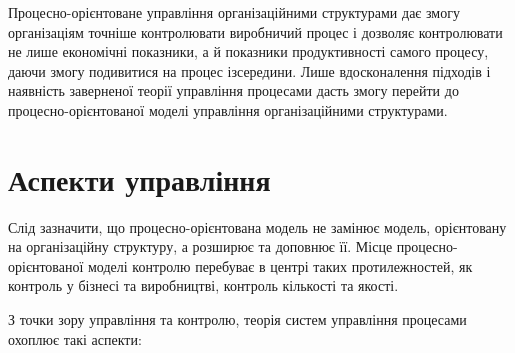 \documentclass{memoir}
\begin{document}
Процесно-орієнтоване управління організаційними структурами дає змогу організаціям точніше контролювати виробничий процес і дозволяє контролювати не лише економічні показники, а й показники продуктивності самого процесу, даючи змогу подивитися на процес ізсередини. Лише вдосконалення підходів і наявність заверненої теорії управління процесами дасть змогу перейти до процесно-орієнтованої моделі управління організаційними структурами.

\section{Аспекти управління}

Слід зазначити, що процесно-орієнтована модель не замінює модель, орієнтовану на організаційну структуру, а розширює та доповнює її. Місце процесно-орієнтованої моделі контролю перебуває в центрі таких протилежностей, як контроль у бізнесі та виробництві, контроль кількості та якості.

З точки зору управління та контролю, теорія систем управління процесами охоплює такі аспекти:
\end{document}
